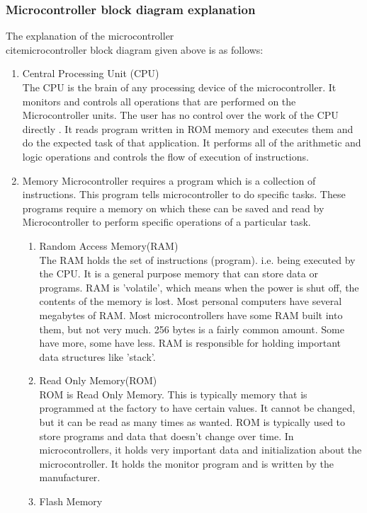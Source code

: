 \subsubsection*{Microcontroller block diagram explanation}
The explanation of the microcontroller\\cite{microcontroller} block diagram given above is as follows:
\begin{enumerate}
\item Central Processing Unit (CPU)\\
The CPU is the brain of any processing device of the microcontroller. It monitors and controls all operations that are performed on the Microcontroller units. The user has no control over the work of the CPU directly . It reads program written in ROM memory and executes them and do the expected task of that application. It performs all of the arithmetic and logic operations and controls the flow of execution of instructions.
\item Memory
Microcontroller requires a program which is a collection of instructions. This program tells microcontroller to do specific tasks. These programs require a memory on which these can be saved and read by Microcontroller to perform specific operations of a particular task. 
\begin{enumerate}
\item Random Access Memory(RAM)\\
The RAM holds the set of instructions (program). i.e. being executed by the CPU. It is a general purpose memory that can store data or programs. RAM is 'volatile', which means when the power is shut off, the contents of the memory is lost. Most personal computers have several megabytes of RAM. Most microcontrollers have some RAM built into them, but not very much. 256 bytes is a fairly common amount. Some have more, some have less. RAM is responsible for holding important data structures like 'stack'.\\
\item Read Only Memory(ROM)\\
ROM is Read Only Memory. This is typically memory that is programmed at the factory to have certain values. It cannot be changed, but it can be read as many times as wanted. ROM is typically used to store programs and data that doesn't change over time. In microcontrollers, it holds very important data and initialization about the microcontroller. It holds the monitor program and is written by the manufacturer. \\
\item Flash Memory

\end{enumerate}
\end{enumerate}
